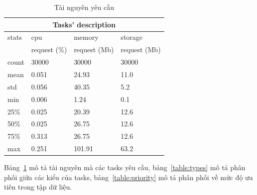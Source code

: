 \documentclass{my_style}
\begin{document}
\begin{table}[h!]
	\centering
	\caption{Tài nguyên yêu cầu}
        \begin{tabular}{| p{1.5cm} | p{1.5cm} | p{1.5cm} | p{1.5cm} |}
            \hline
            \multicolumn{4}{|c|}{Tasks' description} \\
            \hline
            stats & cpu & memory & storage \\
            	 & request (\%) & request (Mb) & request (Mb) \\
            \hline 
            \hline
            count & 30000 & 30000 & 30000 \\
            \hline
            mean & 0.051 & 24.93 & 11.0 \\
            \hline
            std & 0.056 & 40.35 & 5.2 \\
            \hline
            min & 0.006 & 1.24 & 0.1 \\
            \hline 
            25\% & 0.025 & 20.39 & 12.6 \\
            \hline 
            50\% & 0.025 & 26.75 & 12.6 \\
            \hline
            75\% & 0.313 & 26.75 & 12.6 \\
            \hline 
            max & 0.251 & 101.91 & 63.2 \\
            \hline
        \end{tabular}
	\label{table:request}
\end{table}

\noindent
Bảng~\ref{table:request} mô tả tài nguyên mà các tasks yêu cầu, bảng~\ref{table:types} mô tả phân phối giữa các kiểu của tasks, bảng~\ref{table:priority} mô tả phân phối về mức độ ưu tiên trong tập dữ liệu. 
\end{document}
